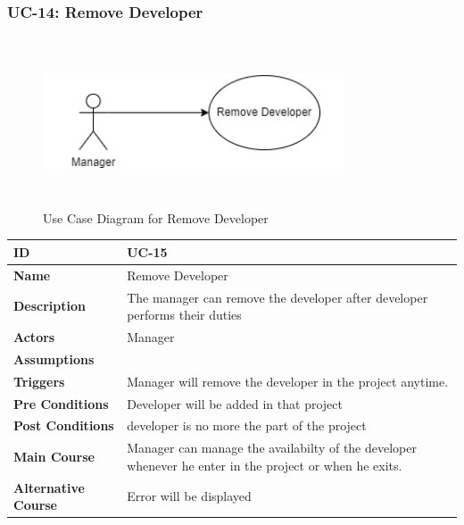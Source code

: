     \newpage

    \subsubsection{UC-14: Remove Developer}
    \begin{figure}[H]
        \includegraphics[height=5cm, width=0.8\textwidth]{./diagrams/Use Case/u14.png}
        \centering 
        \caption{Use Case Diagram for Remove Developer}
        \label{fig:Usecase1}
        \end{figure}
        
    \begin{center}
        \begin{tabularx}{\textwidth}{|l|X|}
            \hline
            \textbf{ID} & UC-15 \\
            \hline
            \textbf{Name} & Remove Developer \\
            \hline
            \textbf{Description} & The manager can remove the developer after developer performs their duties \\
            \hline
            \textbf{Actors} & Manager \\
            \hline
            \textbf{Assumptions} &  \\
            \hline
            \textbf{Triggers} & Manager will remove the developer in the project anytime. \\
            \hline
            \textbf{Pre Conditions} & Developer will be added in that project \\
            \hline
            \textbf{Post Conditions} & developer is no more the part of the project \\
            \hline
            \textbf{Main Course} & Manager can manage the availabilty of the developer whenever he enter in the project or when he exits. \\
            \hline
            \textbf{Alternative Course} & Error will be displayed \\
            \hline
            
        \end{tabularx}
    \end{center}
    \newpage
    

